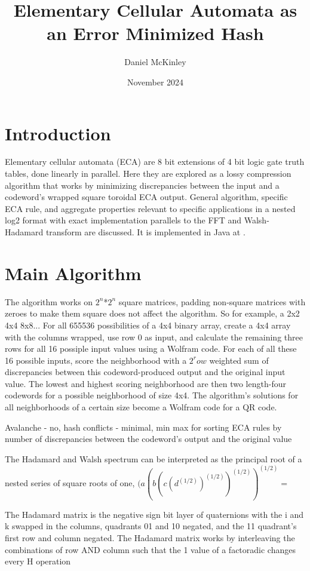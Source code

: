\documentclass[11pt]{article}
\title{Elementary Cellular Automata as an Error Minimized Hash}
\date{November 2024}
\author{Daniel McKinley}
\begin{document}
\maketitle

\section{Introduction}

Elementary cellular automata (ECA) are 8 bit extensions of 4 bit logic gate truth tables, done linearly in parallel. \cite{Wolfram}
Here they are explored as a lossy compression algorithm that works by minimizing discrepancies between
the input and a codeword's wrapped square toroidal ECA output. General algorithm, specific ECA rule, and aggregate properties relevant 
to specific applications in a nested log2 format with exact implementation parallels to the FFT and Walsh-Hadamard transform  are discussed. It is implemented in Java at \cite{mygit}. 
\\
\section{Main Algorithm}

The algorithm works on $2^n$*$2^n$ square matrices, padding non-square matrices with zeroes to make them square does not affect the algorithm. So for example, a 2x2 4x4 8x8... 
For all 655536 possibilities of a 4x4 binary array, create a 4x4 array with the columns wrapped, use row 0 as input, and calculate the remaining three rows for all 16 possiple input values using a Wolfram code. For each of all these 16 possible inputs, score the neighborhood with a $2^row$ weighted sum of discrepancies between this codeword-produced output and the original input value. The lowest and highest scoring neighborhood are then two length-four codewords for a possible neighborhood of size 4x4. The algorithm's solutions for all neighborhoods of a certain size become a Wolfram code for a QR code.

Avalanche - no, hash conflicts - minimal, min max for sorting ECA rules by number of discrepancies between the codeword's output and the original value

The Hadamard and Walsh spectrum can be interpreted as the principal root of a nested series of square roots of one, $(a(b(c(d^(1/2))^(1/2))^(1/2))^(1/2) =$

The Hadamard matrix is the negative sign bit layer of quaternions with the i and k swapped in the columns, quadrants 01 and 10 negated, and the 11 quadrant's first row and column negated. The Hadamard matrix works by interleaving the combinations of row AND column such that the 1 value of a factoradic changes every H operation
\end{document}
